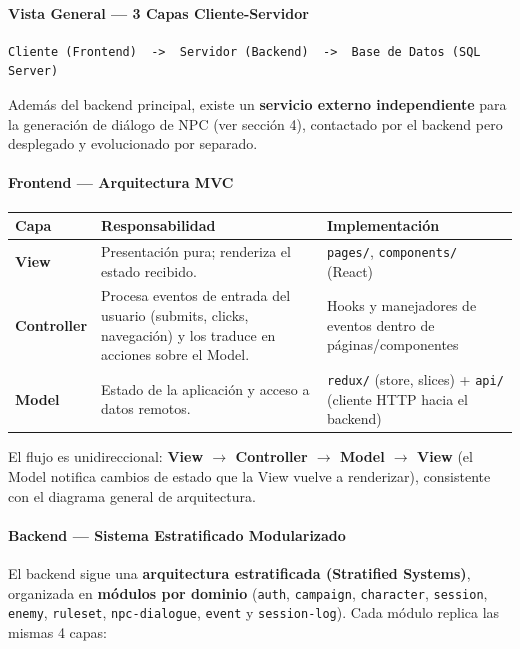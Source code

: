 \paragraph{Vista General — 3 Capas Cliente-Servidor}
\begin{verbatim}
Cliente (Frontend)  ->  Servidor (Backend)  ->  Base de Datos (SQL Server)
\end{verbatim}
Además del backend principal, existe un \textbf{servicio externo independiente} para la generación de diálogo de NPC (ver sección 4), contactado por el backend pero desplegado y evolucionado por separado.

\paragraph{Frontend — Arquitectura MVC}
{\small\setlength{\tabcolsep}{4pt}\renewcommand{\arraystretch}{1.15}
\begin{longtable}{|>{\raggedright\arraybackslash}p{5.0cm}|>{\raggedright\arraybackslash}p{5.0cm}|>{\raggedright\arraybackslash}p{5.0cm}|}
\hline
\textbf{Capa} & \textbf{Responsabilidad} & \textbf{Implementación} \\ \hline\endhead
\textbf{View} & Presentación pura; renderiza el estado recibido. & \texttt{pages/\allowbreak{}}, \texttt{components/\allowbreak{}} (React) \\ \hline
\textbf{Controller} & Procesa eventos de entrada del usuario (submits, clicks, navegación) y los traduce en acciones sobre el Model. & Hooks y manejadores de eventos dentro de páginas/componentes \\ \hline
\textbf{Model} & Estado de la aplicación y acceso a datos remotos. & \texttt{redux/\allowbreak{}} (store, slices) + \texttt{api/\allowbreak{}} (cliente HTTP hacia el backend) \\ \hline
\end{longtable}}
El flujo es unidireccional: \textbf{View $\rightarrow$ Controller $\rightarrow$ Model $\rightarrow$ View} (el Model notifica cambios de estado que la View vuelve a renderizar), consistente con el diagrama general de arquitectura.

\paragraph{Backend — Sistema Estratificado Modularizado}
El backend sigue una \textbf{arquitectura estratificada (Stratified Systems)}, organizada en \textbf{módulos por dominio} (\texttt{auth}, \texttt{campaign}, \texttt{character}, \texttt{session}, \texttt{enemy}, \texttt{ruleset}, \texttt{npc-dialogue}, \texttt{event} y \texttt{session-log}). Cada módulo replica las mismas 4 capas:

